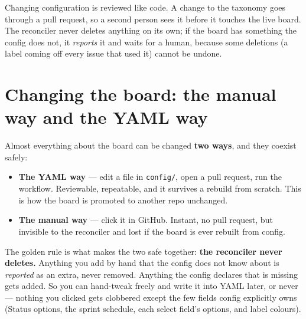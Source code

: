 \documentclass[11pt,a4paper]{report}
\newcommand{\code}[1]{\texttt{#1}}
\begin{document}
\begin{notebox}
Changing configuration is reviewed like code. A change to the taxonomy goes through
a pull request, so a second person sees it before it touches the live board. The
reconciler never deletes anything on its own; if the board has something the config
does not, it \emph{reports} it and waits for a human, because some deletions (a
label coming off every issue that used it) cannot be undone.
\end{notebox}

\chapter{Changing the board: the manual way and the YAML way}

Almost everything about the board can be changed \textbf{two ways}, and they
coexist safely:

\begin{itemize}[leftmargin=1.4em,itemsep=2pt]
  \item \textbf{The YAML way} --- edit a file in \code{config/}, open a pull
        request, run the workflow. Reviewable, repeatable, and it survives a
        rebuild from scratch. This is how the board is promoted to another repo
        unchanged.
  \item \textbf{The manual way} --- click it in GitHub. Instant, no pull request,
        but invisible to the reconciler and lost if the board is ever rebuilt from
        config.
\end{itemize}

\begin{plainenglish}
The golden rule is what makes the two safe together: \textbf{the reconciler never
deletes.} Anything you add by hand that the config does not know about is
\emph{reported} as an extra, never removed. Anything the config declares that is
missing gets added. So you can hand-tweak freely and write it into YAML later, or
never --- nothing you clicked gets clobbered except the few fields config
explicitly owns (Status options, the sprint schedule, each select field's
options, and label colours).
\end{plainenglish}
\end{document}
